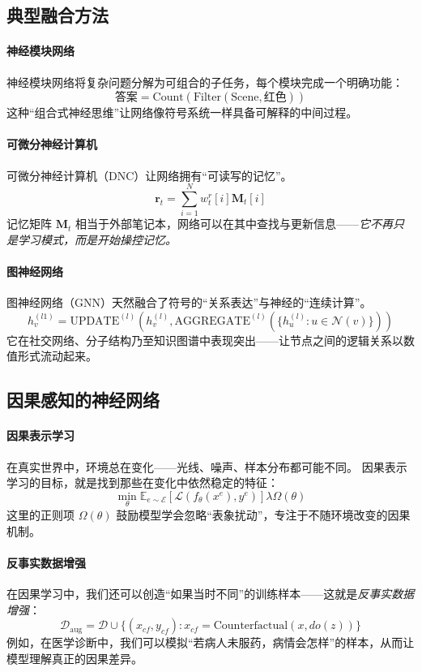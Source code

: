 \subsection{典型融合方法}

\paragraph{神经模块网络}
神经模块网络将复杂问题分解为可组合的子任务，每个模块完成一个明确功能：  
$$\text{答案} = \text{Count}(\text{Filter}(\text{Scene}, \text{红色}))$$
这种“组合式神经思维”让网络像符号系统一样具备可解释的中间过程。

\paragraph{可微分神经计算机}
可微分神经计算机（DNC）让网络拥有“可读写的记忆”。  
$$\mathbf{r}_t = \sum_{i=1}^{N} w_t^r[i] \mathbf{M}_t[i]$$
记忆矩阵 $\mathbf{M}_t$ 相当于外部笔记本，网络可以在其中查找与更新信息——\emph{它不再只是学习模式，而是开始操控记忆。}

\paragraph{图神经网络}
图神经网络（GNN）天然融合了符号的“关系表达”与神经的“连续计算”。  
$$h_v^{(l1)} = \text{UPDATE}^{(l)}\left(h_v^{(l)}, \text{AGGREGATE}^{(l)}\left(\{h_u^{(l)} : u \in \mathcal{N}(v)\}\right)\right)$$
它在社交网络、分子结构乃至知识图谱中表现突出——让节点之间的逻辑关系以数值形式流动起来。

\subsection{因果感知的神经网络}

\paragraph{因果表示学习}
在真实世界中，环境总在变化——光线、噪声、样本分布都可能不同。  
因果表示学习的目标，就是找到那些在变化中依然稳定的特征：  
$$\min_{\theta} \mathbb{E}_{e \sim \mathcal{E}} \left[ \mathcal{L}(f_\theta(x^e), y^e) \right]  \lambda \Omega(\theta)$$
这里的正则项 $\Omega(\theta)$ 鼓励模型学会忽略“表象扰动”，专注于不随环境改变的因果机制。

\paragraph{反事实数据增强}
在因果学习中，我们还可以创造“如果当时不同”的训练样本——这就是\emph{反事实数据增强}：  
$$\mathcal{D}_{\text{aug}} = \mathcal{D} \cup \{(x_{cf}, y_{cf}) : x_{cf} = \text{Counterfactual}(x, do(z))\}$$
例如，在医学诊断中，我们可以模拟“若病人未服药，病情会怎样”的样本，从而让模型理解真正的因果差异。

